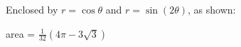 {Enclosed by $r=\cos \theta$ and $r=\sin(2\theta)$, as shown:

}
{area = $\frac{1}{32}(4\pi-3\sqrt{3})$
}
